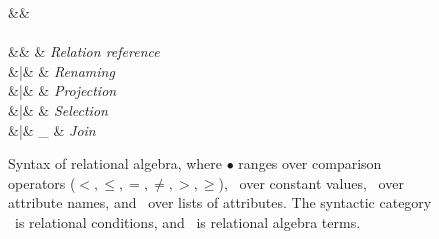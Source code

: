 \begin{figure}

\begin{syntax}


\synDef{\pCond}{\pCondSet}
  &\eqq&  \\
\\[1.5ex]

\synDef{\pQ}{\pQSet}
  &\eqq& \pRel                 & \textit{Relation reference} \\
     &|& \pRen[\pRel]{\pQ}     & \textit{Renaming} \\
     &|& \pPrj[\pAttList]{\pQ} & \textit{Projection} \\
     &|& \pSel\pQ              & \textit{Selection} \\
     &|& \pQ \Join_{\pCond} \pQ  & \textit{Join} \\
\end{syntax}

\caption{Syntax of  relational algebra, where $\bullet$ ranges over
comparison operators ($<, \leq, =, \neq, >, \geq$), \cte\ over constant values,
\att\ over attribute names, and \pAttList\ over lists of attributes.
The syntactic category
 \pCond\
is relational conditions, and \pQ\ is  relational algebra terms.
}
\label{fig:v-alg-def}
\end{figure}
